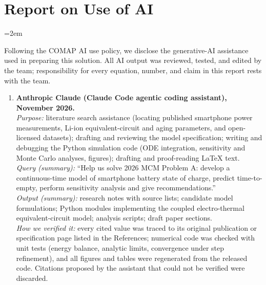 \clearpage
{}
\section*{Report on Use of AI}
\emergencystretch=2em

Following the COMAP AI use policy, we disclose the generative-AI assistance used in preparing this solution.
All AI output was reviewed, tested, and edited by the team; responsibility for every equation, number, and
claim in this report rests with the team.

\begin{enumerate}[leftmargin=1.5em,label=\arabic*.]
  \item \textbf{Anthropic Claude (Claude Code agentic coding assistant), November 2026.}\\
  \emph{Purpose:} literature search assistance (locating published smartphone power measurements, Li-ion
  equivalent-circuit and aging parameters, and open-licensed datasets); drafting and reviewing the model
  specification; writing and debugging the Python simulation code (ODE integration, sensitivity and Monte Carlo
  analyses, figures); drafting and proof-reading \LaTeX{} text.\\
  \emph{Query (summary):} ``Help us solve 2026 MCM Problem A: develop a continuous-time model of smartphone
  battery state of charge, predict time-to-empty, perform sensitivity analysis and give recommendations.''\\
  \emph{Output (summary):} research notes with source lists; candidate model formulations; Python modules
  implementing the coupled electro-thermal equivalent-circuit model; analysis scripts; draft paper sections.\\
  \emph{How we verified it:} every cited value was traced to its original publication or specification page
  listed in the References; numerical code was checked with unit tests (energy balance, analytic limits,
  convergence under step refinement), and all figures and tables were regenerated from the released code.
  Citations proposed by the assistant that could not be verified were discarded.
\end{enumerate}

